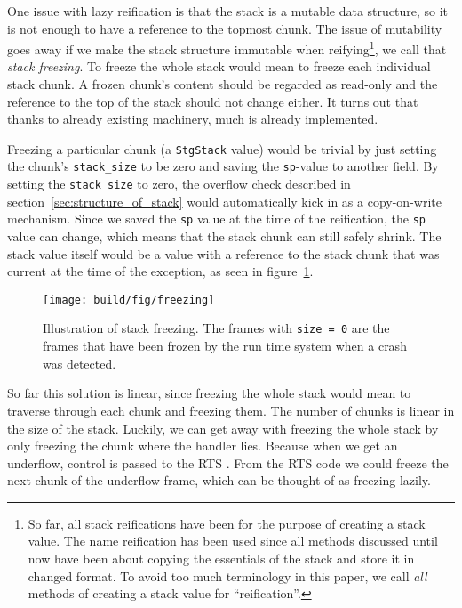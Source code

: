 One issue with lazy reification is that the stack is a mutable data
structure, so it is not enough to have a reference to the
topmost chunk. The issue of mutability goes away if we make the stack structure
immutable when reifying\footnote{So far, all stack reifications have been for
  the purpose of creating a stack value. The name reification has been used
  since all methods discussed until now have been about copying the essentials
  of the stack and store it in changed format. To avoid too much terminology in
  this paper, we call \emph{all} methods of creating a stack value for
  ``reification''.}, we call that \emph{stack freezing}. To freeze the whole stack
would mean to freeze each individual stack chunk. A frozen chunk's
content should be regarded as read-only and the reference to the top
of the stack should not change either. It turns out that thanks to
already existing machinery, much is already implemented.

Freezing a particular chunk (a \texttt{StgStack} value) would be
trivial by just setting the chunk's \texttt{stack\_size} to be zero
and saving the \texttt{sp}-value to another field. By setting
the \texttt{stack\_size} to zero, the overflow check described in
section~\ref{sec:structure_of_stack} would automatically kick in as a
copy-on-write mechanism. Since we saved the \texttt{sp} value at the time of the reification,
the \texttt{sp} value can change, which means that the stack chunk
can still safely shrink. The stack value itself would be a value with
a reference to the stack chunk that was current at the time of the
exception, as seen in figure~\ref{fig:freezing}.

\begin{figure}
\begin{mdframed}
  \texttt{[image: build/fig/freezing]}
  \caption{Illustration of stack freezing. The frames with \texttt{size = 0}
    are the frames that have been frozen by the run time system when a crash
    was detected.}
  \label{fig:freezing}
\end{mdframed}
\end{figure}

So far this solution is linear, since freezing the whole stack would mean
to traverse through each chunk and freezing them. The number of chunks is
linear in the size of the stack. Luckily, we can get away with freezing
the whole stack by only freezing the chunk where the handler lies.
Because when we get an underflow, control is passed to the RTS
\cite{github_underflow_frame}. From the RTS code we could freeze
the next chunk of the underflow frame, which can be thought of as freezing lazily.


